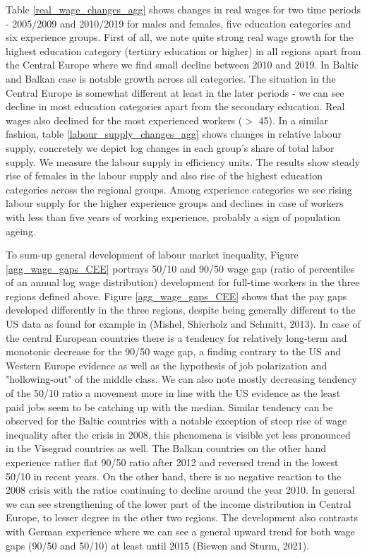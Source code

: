 \documentclass{article}
\begin{document}
Table \ref{real_wage_changes_agg} shows changes in real wages for two time periods - 2005$/$2009 and 2010$/$2019 for males and females, five education categories and six experience groups. First of all, we note quite strong real wage growth for the highest education category (tertiary education or higher) in all regions apart from the Central Europe where we find small decline between 2010 and 2019. In Baltic and Balkan case is notable growth across all categories. The situation in the Central Europe is somewhat different at least in the later periods - we can see decline in most education categories apart from the secondary education. Real wages also declined for the most experienced workers ($>$ 45).
In a similar fashion, table \ref{labour_supply_changes_agg} shows changes in relative labour supply, concretely we depict log changes in each group's share of total labor supply. We measure the labour supply in efficiency units. The results show steady rise of females in the labour supply and also rise of the highest education categories across the regional groups. Among experience categories we see rising labour supply for the higher experience groups and declines in case of workers with less than five years of working experience, probably a sign of population ageing.

To sum-up general development of labour market inequality, Figure \ref{agg_wage_gaps_CEE} portrays 50/10 and 90/50 wage gap (ratio of percentiles of an annual log wage distribution) development for full-time workers in the three regions defined above.
Figure \ref{agg_wage_gaps_CEE} shows that the pay gaps developed differently in the three regions, despite being generally different to the US data as found for example in (Mishel, Shierholz and Schmitt, 2013). In case of the central European countries there is a tendency for relatively long-term and monotonic decrease for the 90/50 wage gap, a finding contrary to the US and Western Europe evidence as well as the hypothesis of job polarization and "hollowing-out" of the middle class. We can also note mostly decreasing tendency of the 50/10 ratio a movement more in line with the US evidence as the least paid jobs seem to be catching up with the median. Similar tendency can be observed for the Baltic countries with a notable exception of steep rise of wage inequality after the crisis in 2008, this phenomena is visible yet less pronounced in the Visegrad countries as well. The Balkan countries on the other hand experience rather flat 90/50 ratio after 2012 and reversed trend in the lowest 50/10 in recent years. On the other hand, there is no negative reaction to the 2008 crisis with the ratios continuing to decline around the year 2010.
In general we can see strengthening of the lower part of the income distribution in Central Europe, to lesser degree in the other two regions. The development also contrasts with German experience where we can see a general upward trend for both wage gaps (90/50 and 50/10) at least until 2015 (Biewen and Sturm, 2021).
\end{document}
